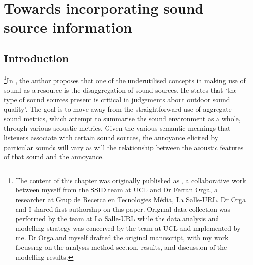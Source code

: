 \chapter{Towards incorporating sound source information}
\label{ch:mlmann}



\section{Introduction}

\footnote{The content of this chapter was originally published as \citet{Orga2021Multilevel}, a collaborative work between myself from the SSID team at UCL and Dr Ferran Orga, a researcher at Grup de Recerca en Tecnologies M{\'e}dia, La Salle-URL. Dr Orga and I shared first authorship on this paper. Original data collection was performed by the team at La Salle-URL while the data analysis and modelling strategy was conceived by the team at UCL and implemented by me. Dr Orga and myself drafted the original manuscript, with my work focussing on the analysis method section, results, and discussion of the modelling results.}In \citet{Brown2009acoustic}, the author proposes that one of the underutilised concepts in making use of sound as a resource is the disaggregation of sound sources. He states that `the type of sound sources present is critical in judgements about outdoor sound quality'. The goal is to move away from the straightforward use of aggregate sound metrics, which attempt to summarise the sound environment as a whole, through various acoustic metrics. Given the various semantic meanings that listeners associate with certain sound sources, the annoyance elicited by particular sounds will vary as will the relationship between the acoustic features of that sound and the annoyance. 

